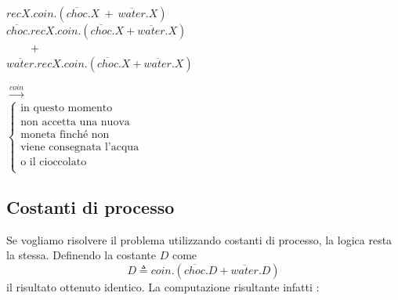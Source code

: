 		\begin{minipage}{0.55\linewidth}
			\begin{flushleft}
				\vspace{-4 mm}
				$recX.coin.(\overline{choc}.X\ + \ \overline{water}.X)$\\
				\vspace{20 mm}
				$\overline{choc}.recX.coin.(\overline{choc}.X + \overline{water}.X)$\\
				$\qquad +$\\
				$\overline{water}.recX.coin.(\overline{choc}.X + \overline{water}.X)$\\
			\end{flushleft}
		\end{minipage}
		\begin{minipage}{0.4\linewidth}
			\begin{flushright}
				\vspace{7 mm}
				$\xrightarrow{coin}$\\
				\vspace{9 mm}
				$\begin{cases}
					\text{in questo momento }\\
					\text{non accetta una nuova}\\
					\text{moneta finch\'e non}\\
					\text{viene consegnata l'acqua}\\
					\text{o il cioccolato}\\
				\end{cases}$\\
			\end{flushright}
		\end{minipage}
		
		\subsection{Costanti di processo}
		
		Se vogliamo risolvere il problema utilizzando costanti di processo, la logica resta la stessa. Definendo la costante $D$ come
		$$D \triangleq coin.(\overline{choc}.D + \overline{water}.D)$$ il risultato ottenuto \eacc identico. La computazione risultante infatti \eacc:
		
